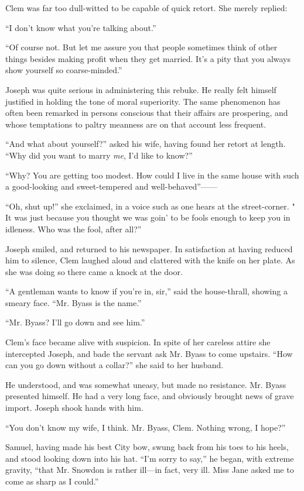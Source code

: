 Clem was far too dull-witted to be capable of quick retort. She merely
replied:

``I don't know what you're talking about.''

``Of course not. But let me assure you that people sometimes think of
other things besides making profit when they get married. It's a pity
that you always show yourself so coarse-minded.''

Joseph was quite serious in administering this rebuke. He really felt
himself justified in holding the tone of moral superiority. The same
phenomenon has often been remarked in persons conscious that their
affairs are prospering, and whose temptations to paltry meanness are on
that account less frequent.

{\protect\hypertarget{159}{}{}}``And what about yourself?'' asked his
wife, having found her retort at length. ``Why did you want to marry
\emph{me}, I'd like to know?''

``Why? You are getting too modest. How could I live in the same house
with such a good-looking and sweet-tempered and well-behaved''{{------}}

``Oh, shut up!'' she exclaimed, in a voice such as one hears at the
street-corner. " It was just because you thought we was goin' to be
fools enough to keep you in idleness. Who was the fool, after all?''

Joseph smiled, and returned to his newspaper. In satisfaction at having
reduced him to silence, Clem laughed aloud and clattered with the knife
on her plate. As she was doing so there came a knock at the door.

``A gentleman wants to know if you're in, sir,'' said the house-thrall,
showing a smeary face. ``Mr. Byass is the name.''

``Mr. Byass? I'll go down and see him.''

Clem's face became alive with suspicion. In spite of her careless attire
she intercepted Joseph, and bade the servant ask Mr. Byass to come
upstairs. ``How can you go down without a collar?'' she said to her
husband.

{\protect\hypertarget{160}{}{}}He understood, and was somewhat uneasy,
but made no resistance. Mr. Byass presented himself. He had a very long
face, and obviously brought news of grave import. Joseph shook hands
with him.

``You don't know my wife, I think. Mr. Byass, Clem. Nothing wrong, I
hope?''

Samuel, having made his best City bow, swung back from his toes to his
heels, and stood looking down into his hat. ``I'm sorry to say,'' he
began, with extreme gravity, ``that Mr. Snowdon is rather ill---in fact,
very ill. Miss Jane asked me to come as sharp as I could.''

